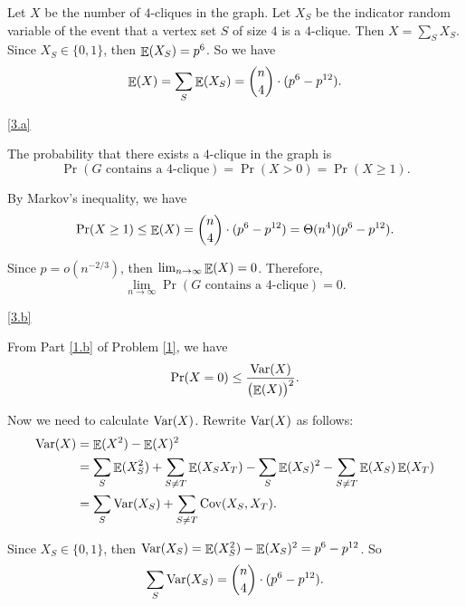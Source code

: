 \documentclass{homework}
\begin{document}
\begin{solution}

  Let $X$ be the number of $4$-cliques in the graph. Let $X_S$ be
  the indicator random variable of the event that
  a vertex set $S$ of size $4$ is a $4$-clique.
  Then $X = \sum_{S} X_S$. Since $X_S \in \{0, 1\}$, then $\mathop{\mathbb{E}}\displaylimits(X_S) = p^6$.
  So we have
  \begin{equation*}
    \mathop{\mathbb{E}}\displaylimits(X) = \sum_{S} \mathop{\mathbb{E}}\displaylimits(X_S) = \binom{n}{4} \cdot (p^6 - p^{12}).
  \end{equation*}

  \ref{3.a}

  The probability that there exists a $4$-clique in the graph is
  \begin{equation*}
    \Pr(G \text{ contains a $4$-clique}) = \Pr(X > 0) = \Pr(X \ge 1).
  \end{equation*}

  By Markov's inequality, we have
  \begin{equation*}
    \Pr(X \ge 1) \le \mathop{\mathbb{E}}\displaylimits(X) = \binom{n}{4} \cdot (p^6 - p^{12}) = \Theta(n^4)(p^6-p^{12}).
  \end{equation*}

  Since $p = o(n^{-2/3})$, then $\lim_{n \to \infty}\mathop{\mathbb{E}}\displaylimits(X) = 0$. Therefore,
  \begin{equation*}
    \lim_{n \to \infty} \Pr(G \text{ contains a $4$-clique}) = 0.
  \end{equation*}

  \ref{3.b}

  From Part \ref{1.b} of Problem \ref{1}, we have
  \begin{equation*}
    \Pr(X = 0) \le \frac{\mathop{\mathrm{Var}}\displaylimits(X)}{{\bigl(\mathop{\mathbb{E}}\displaylimits(X)\bigr)}^{2}}.
  \end{equation*}

  Now we need to calculate $\mathop{\mathrm{Var}}\displaylimits(X)$. Rewrite $\mathop{\mathrm{Var}}\displaylimits(X)$ as follows:
  \begin{align*}
    \mathop{\mathrm{Var}}\displaylimits(X) & = \mathop{\mathbb{E}}\displaylimits(X^2) - \mathop{\mathbb{E}}\displaylimits(X)^2 \\
    & = \sum_{S}\mathop{\mathbb{E}}\displaylimits(X_S^2) + \sum_{S \neq T}\mathop{\mathbb{E}}\displaylimits(X_SX_T) - \sum_S \mathop{\mathbb{E}}\displaylimits(X_S)^2 - \sum_{S \neq T}\mathop{\mathbb{E}}\displaylimits(X_S)\mathop{\mathbb{E}}\displaylimits(X_T) \\
    & = \sum_{S}\mathop{\mathrm{Var}}\displaylimits(X_S) + \sum_{S \neq T}\text{Cov}(X_S, X_T).
  \end{align*}

  Since $X_S \in \{0, 1\}$, then $\mathop{\mathrm{Var}}\displaylimits(X_S) = \mathop{\mathbb{E}}\displaylimits(X_S^2) - \mathop{\mathbb{E}}\displaylimits(X_S)^2 = p^6 - p^{12}$.
  So
  \begin{equation*}
    \sum_{S}\mathop{\mathrm{Var}}\displaylimits(X_S) = \binom{n}{4} \cdot (p^6 - p^{12}).
  \end{equation*}


\end{solution}
\end{document}
